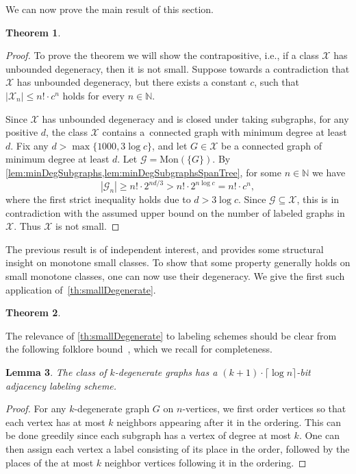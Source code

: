\documentclass[letterpaper,11pt]{article}
\newcommand{\Gc}{\mathcal{G}}
\newcommand{\Xc}{\mathcal{X}}
\newtheorem{theorem}{Theorem}[section]
\newtheorem{lemma}[theorem]{Lemma}
\theoremstyle{definition}
\theoremstyle{remark}
\newcommand{\mon}{\mathrm{Mon}}
\renewcommand{\leq}{\leqslant}
\renewcommand{\geq}{\geqslant}
\begin{document}
        We can now prove the main result of this section.
        
        {\renewcommand{\thetheorem}{\ref{th:smallDegenerate}}
		\begin{theorem}
			\smallDgn	
	\end{theorem}}
	\addtocounter{theorem}{-1}
	\begin{proof}
		To prove the theorem we will show the contrapositive, i.e., if a class $\Xc$ has unbounded degeneracy, then it is not small.
		Suppose towards a contradiction that $\Xc$ has unbounded degeneracy,
		but there exists a constant $c$, such that $|\Xc_n| \leq n! \cdot c^n$ holds for every $n \in \mathbb{N}$.
		
		Since $\Xc$ has unbounded degeneracy and is closed under taking subgraphs, for any positive $d$, the class $\Xc$ contains a~connected graph with minimum degree at least $d$.
        Fix any $d > \max\{ 1000, 3\log c \}$, and let $G \in \Xc$ be a connected graph of minimum degree at least $d$.
                Let $\Gc = \mon(\{G\})$. 
		By \cref{lem:minDegSubgraphs,lem:minDegSubgraphsSpanTree}, for some $n \in \mathbb{N}$ we have 
		\[
		|\Gc_n| \geq n! \cdot 2^{nd/3} > n! \cdot 2^{n\log c} = n! \cdot c^n,
		\]
		where the first strict inequality holds due to $d > 3 \log c$.
		Since $\Gc \subseteq \Xc$, this is in contradiction with the assumed upper bound on the number of labeled graphs in~$\Xc$.
		Thus $\Xc$ is not small.
	\end{proof}
		
        The previous result is of independent interest, and provides some structural insight on monotone small classes.
        To show that some property generally holds on small monotone classes, one can now use their degeneracy.
        We give the first such application of~\cref{th:smallDegenerate}. 	
	
	{\renewcommand{\thetheorem}{\ref{cor:monSmall-ir}}
		\begin{theorem}
			\smallcor	
		\end{theorem}}
		\addtocounter{theorem}{-1}
		
	
The relevance of \cref{th:smallDegenerate} to labeling schemes should be clear from the following folklore bound~\cite{KNR92}, which we recall for completeness.
	
	\begin{lemma}\label{lem:degenlabel}
		The class of $k$-degenerate graphs has a  $(k+1)\cdot\lceil\log n\rceil $-bit adjacency labeling scheme. 
	\end{lemma} 
	\begin{proof}
		For any $k$-degenerate graph $G$ on $n$-vertices, we first order vertices so that each vertex has at most $k$ neighbors appearing after it in the ordering. This can be done greedily since each subgraph has a vertex of degree at most $k$. One can then assign each vertex a label consisting of its place in the order, followed by the places of the at most $k$ neighbor vertices following it in the ordering.  
	\end{proof}
	
\end{document}
